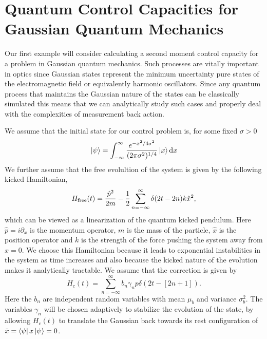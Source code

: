 \documentclass[superscriptaddress,aps,pra,nofootinbib,onecolumn,notitlepage,10pt]{revtex4-1}
\def\bra#1{\mathinner{\langle{#1}|}}
\def\ket#1{\mathinner{|{#1}\rangle}}
\begin{document}
\section{Quantum Control Capacities for Gaussian Quantum Mechanics}
Our first example will consider calculating a second moment control capacity for a problem in Gaussian quantum mechanics.
Such processes are vitally important in optics since Gaussian states represent the minimum uncertainty pure states
of the electromagnetic field or equivalently harmonic oscillators.  Since any quantum process that maintains the Gaussian
nature of the states can be classically simulated this means that we can analytically study such cases and properly deal
with the complexities of measurement back action.

We assume that the initial state for our control problem is, for some fixed $\sigma>0$
\begin{equation}
\ket{\psi} = \int_{-\infty}^\infty \frac{e^{-x^2/4\sigma^2}}{(2\pi \sigma^2)^{1/4}}\ket{x}\mathrm{d}x\label{eq:psi0}
\end{equation}
We further assume that the free evolultion of the system is given by the following kicked Hamiltonian,
\begin{equation}
H_{\rm free}(t) = \frac{\hat{p}^2}{2m} - \frac{1}{2}\sum_{n=-\infty}^\infty \delta(2t-2n) k \hat{x}^2,
\end{equation}
which can be viewed as a linearization of the quantum kicked pendulum.  Here $\hat{p} = i \partial_x$ is the momentum operator, $m$ is the mass of the particle, $\hat{x}$ is the position operator and $k$ is the strength of the force pushing the system away from $x=0$. We choose this Hamiltonian because it leads to exponential instabilities
in the system as time increases and also because the kicked nature of the evolution makes it analytically tractable.
We assume that the correction is given by
\begin{equation}
H_{c}(t) = \sum_{n=-\infty}^\infty b_n \gamma_n p\delta(2t-[2n+1]).
\end{equation}
Here the $b_n$ are independent random variables with mean $\mu_b$ and variance $\sigma_b^2$.  The variables $\gamma_n$ will be chosen adaptively to stabilize the evolution of the state, by allowing $H_c(t)$ to translate the Gaussian back towards its rest configuration of $\bar{x} = \bra{\psi} x \ket{\psi}=0$.
\end{document}
